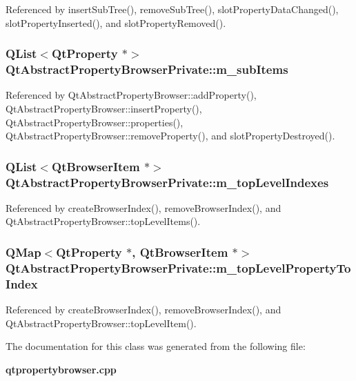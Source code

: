 Referenced by insert\+Sub\+Tree(), remove\+Sub\+Tree(), slot\+Property\+Data\+Changed(), slot\+Property\+Inserted(), and slot\+Property\+Removed().

\subsubsection[{m\+\_\+sub\+Items}]{\setlength{\rightskip}{0pt plus 5cm}Q\+List$<${\bf Qt\+Property} $\ast$$>$ Qt\+Abstract\+Property\+Browser\+Private\+::m\+\_\+sub\+Items}\label{classQtAbstractPropertyBrowserPrivate_a6b1a296cd260d1660860e0d12aca1853}


Referenced by Qt\+Abstract\+Property\+Browser\+::add\+Property(), Qt\+Abstract\+Property\+Browser\+::insert\+Property(), Qt\+Abstract\+Property\+Browser\+::properties(), Qt\+Abstract\+Property\+Browser\+::remove\+Property(), and slot\+Property\+Destroyed().

\subsubsection[{m\+\_\+top\+Level\+Indexes}]{\setlength{\rightskip}{0pt plus 5cm}Q\+List$<${\bf Qt\+Browser\+Item} $\ast$$>$ Qt\+Abstract\+Property\+Browser\+Private\+::m\+\_\+top\+Level\+Indexes}\label{classQtAbstractPropertyBrowserPrivate_ab88513a70bad6044610c5572090a8022}


Referenced by create\+Browser\+Index(), remove\+Browser\+Index(), and Qt\+Abstract\+Property\+Browser\+::top\+Level\+Items().

\subsubsection[{m\+\_\+top\+Level\+Property\+To\+Index}]{\setlength{\rightskip}{0pt plus 5cm}Q\+Map$<${\bf Qt\+Property} $\ast$, {\bf Qt\+Browser\+Item} $\ast$$>$ Qt\+Abstract\+Property\+Browser\+Private\+::m\+\_\+top\+Level\+Property\+To\+Index}\label{classQtAbstractPropertyBrowserPrivate_ac42d7f985d0160f880ffef8e9c6862fd}


Referenced by create\+Browser\+Index(), remove\+Browser\+Index(), and Qt\+Abstract\+Property\+Browser\+::top\+Level\+Item().



The documentation for this class was generated from the following file\+:\begin{DoxyCompactItemize}
\item 
{\bf qtpropertybrowser.\+cpp}\end{DoxyCompactItemize}
